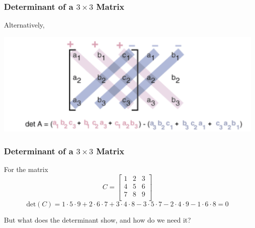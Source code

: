 \documentclass{beamer}
\begin{document}
\begin{frame}
  \frametitle{Determinant of a \(3 \times 3\) Matrix}
 Alternatively,
  \begin{center}
    \includegraphics[width=\textwidth]{det_3_3.png}
  \end{center}
  \end{frame}


\begin{frame}
  \frametitle{Determinant of a \(3 \times 3\) Matrix}

  \begin{example}
    For the matrix
    \[
      C = \begin{bmatrix}
        1 & 2 & 3 \\
        4 & 5 & 6 \\
        7 & 8 & 9 \\
      \end{bmatrix}
    \]
    \[
      \text{det}(C) = 1\cdot5 \cdot 9 + 2\cdot6\cdot7 + 3\cdot4\cdot8-3\cdot5\cdot7-2\cdot4\cdot9-1\cdot6\cdot8= 0
    \]
  \end{example}

\pause

But what does the determinant show, and how do we need it?


  \end{frame}






\end{document}

